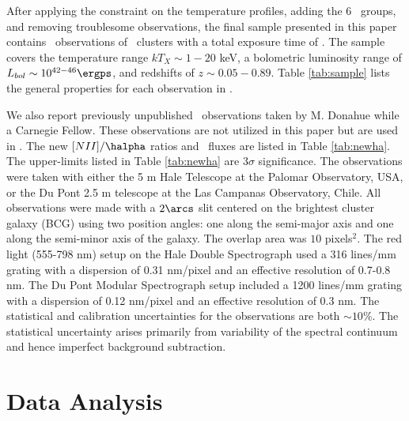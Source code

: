 \documentclass{emulateapj}
\begin{document}
After applying the constraint on the temperature profiles, adding the
6 \hifl\ groups, and removing troublesome observations, the final
sample presented in this paper contains \numobs\ observations of
\numcluster\ clusters with a total exposure time of \expt. The sample
covers the temperature range $kT_X \sim 1-20$ keV, a bolometric
luminosity range of $L_{bol} \sim 10^{42-46} \ergps$, and redshifts of
$z \sim 0.05-0.89$. Table \ref{tab:sample} lists the general
properties for each observation in \accept.

We also report previously unpublished \halpha\ observations taken by
M. Donahue while a Carnegie Fellow. These observations are not
utilized in this paper but are used in \citet{haradent}. The new
$[NII]/\halpha$ ratios and \halpha\ fluxes are listed in Table
\ref{tab:newha}. The upper-limits listed in Table \ref{tab:newha} are
$3\sigma$ significance. The observations were taken with either the 5
m Hale Telescope at the Palomar Observatory, USA, or the Du Pont 2.5 m
telescope at the Las Campanas Observatory, Chile. All observations
were made with a $2\arcs$ slit centered on the brightest cluster
galaxy (BCG) using two position angles: one along the semi-major axis
and one along the semi-minor axis of the galaxy. The overlap area was
$10$ pixels$^2$. The red light (555-798 nm) setup on the Hale Double
Spectrograph used a 316 lines/mm grating with a dispersion of 0.31
nm/pixel and an effective resolution of 0.7-0.8 nm. The Du Pont
Modular Spectrograph setup included a 1200 lines/mm grating with a
dispersion of 0.12 nm/pixel and an effective resolution of 0.3 nm. The
statistical and calibration uncertainties for the observations are
both $\sim 10\%$. The statistical uncertainty arises primarily from
variability of the spectral continuum and hence imperfect background
subtraction.

\section{Data Analysis}
\label{sec:data}
\end{document}
